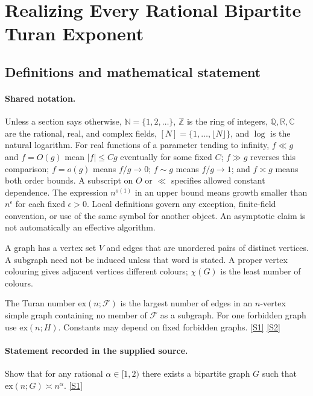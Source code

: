 \documentclass[11pt,a4paper]{article}
\newcommand{\N}{\mathbb{N}}
\newcommand{\Z}{\mathbb{Z}}
\newcommand{\Q}{\mathbb{Q}}
\newcommand{\R}{\mathbb{R}}
\newcommand{\C}{\mathbb{C}}
\newcommand{\sref}[2]{\hyperlink{source:#1:#2}{[S#2]}}
\begin{document}
\section{Realizing Every Rational Bipartite Turan Exponent}\label{statement}


\subsection{Definitions and mathematical statement}

\paragraph{Shared notation.}Unless a section says otherwise, $\N=\{1,2,\ldots\}$,
$\Z$ is the ring of integers, $\Q,\R,\C$ are the rational, real, and complex
fields, $[N]=\{1,\ldots,\lfloor N\rfloor\}$, and $\log$ is the natural
logarithm. For real functions of a parameter tending to infinity,
$f\ll g$ and $f=O(g)$ mean $|f|\leq Cg$ eventually for some fixed $C$;
$f\gg g$ reverses this comparison; $f=o(g)$ means $f/g\to0$;
$f\sim g$ means $f/g\to1$; and $f\asymp g$ means both order bounds.
A subscript on $O$ or $\ll$ specifies allowed constant dependence.
The expression $n^{o(1)}$ in an upper bound means growth smaller than
$n^\epsilon$ for each fixed $\epsilon>0$. Local definitions govern any
exception, finite-field convention, or use of the same symbol for another
object. An asymptotic claim is not automatically an effective algorithm.



A graph has a vertex set $V$ and edges that are unordered pairs of distinct vertices. A subgraph need not be induced unless that word is stated. A proper vertex colouring gives adjacent vertices different colours; $\chi(G)$ is the least number of colours.

The Turan number $\mathrm{ex}(n;\mathcal F)$ is the largest number of edges in an $n$-vertex simple graph containing no member of $\mathcal F$ as a subgraph. For one forbidden graph use $\mathrm{ex}(n;H)$. Constants may depend on fixed forbidden graphs. \sref{statement}{1} \sref{statement}{2}

\paragraph{Statement recorded in the supplied source.}
Show that for any rational $\alpha \in [1,2)$ there exists a bipartite graph $G$ such that $ \mathrm{ex}(n;G)\asymp n^{\alpha}. $ \sref{statement}{1}
\end{document}

